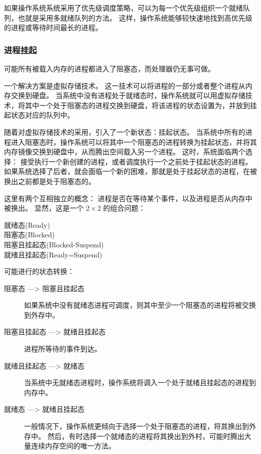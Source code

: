 {{{            如果操作系统系统采用了优先级调度策略，可以为每一个优先级组织一个就绪队列，也就是采用多就绪队列的方法。
            这样，操作系统能够较快速地找到高优先级的进程或等待时间最长的进程。
        }

        \subsubsection{进程挂起}
        {
            {
                可能所有被载入内存的进程都进入了阻塞态，而处理器仍无事可做。

                一个解决方案是虚拟存储技术。
                这一技术可以将进程的一部分或者整个进程从内存交换到硬盘。
                当系统中没有进程处于就绪态时，操作系统就可以用虚拟存储技术，将其中一个处于阻塞态的进程交换到硬盘，将该进程的状态设置为，并放到挂起状态对应的队列中。

                随着对虚拟存储技术的采用，引入了一个新状态：挂起状态。
                当系统中所有的进程进入阻塞态时，操作系统可以将其中一个阻塞态的进程转换为挂起状态，并将其内存镜像交换到硬盘中，从而腾出空间载入另一个进程。
                这时，系统面临两个选择：
                接受执行一个新创建的进程，或者调度执行一个之前处于挂起状态的进程。
                如果系统选择了后者，就会面临一个新的困难，那就是处于挂起状态的进程，在被换出之前都是处于阻塞态的。

                这里有两个互相独立的概念：
                进程是否在等待某个事件，以及进程是否从内存中被换出。
                显然，这是一个 $2 \times 2$ 的组合问题：

                \begin{description}
                    \item[就绪态(Ready)]
                    \item[阻塞态(Blocked)]
                    \item[阻塞且挂起态(Blocked-Suspend)]
                    \item[就绪且挂起态(Ready=Suspend)]
                \end{description}

                可能进行的状态转换：

                \begin{description}
                    \item[阻塞态 ---> 阻塞且挂起态] 如果系统中没有就绪态进程可调度，则其中至少一个阻塞态的进程将被交换到外存中。
                    \item[阻塞且挂起态 ---> 就绪且挂起态] 进程所等待的事件到达。
                    \item[就绪且挂起态 ---> 就绪态] 当系统中无就绪态进程时，操作系统将调入一个处于就绪且挂起态的进程到内存中。
                    \item[就绪态 ---> 就绪且挂起态]
                    {
                        一般情况下，操作系统更倾向于选择一个处于阻塞态的进程，将其换出到外存中。
                        然后，有时选择一个就绪态的进程将其换出到外村，可能时腾出大量连续内存空间的唯一方法。
                    }
                \end{description}

}}}}
